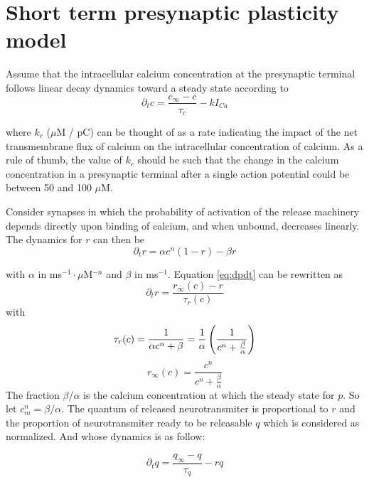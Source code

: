 
\section{Short term presynaptic plasticity model}

Assume that the intracellular calcium concentration at the presynaptic terminal follows linear decay dynamics toward a steady state according to
\begin{equation}
        \partial_t c = \frac{c_{\infty}-c}{\tau_c} - k I_{Ca}
        \label{eq:dcdt}
\end{equation}


where $k_c$ ($\mu$M / pC) can be thought of as a rate indicating the impact of the net transmembrane flux of calcium on the intracellular concentration of calcium. As a rule of thumb, the value of $k_c$ should be such that the change in the calcium concentration in a presynaptic terminal after a single action potential could be between 50 and 100  $\mu$M.

Consider synapses in which the probability of activation of the release machinery  depends directly upon binding of calcium, and when unbound, decreases linearly. The dynamics for $r$ can then be
\begin{equation}
   \partial_t r =  \alpha c^n(1-r)-\beta r   \label{eq:dpdt}
\end{equation}

with $\alpha$ in ms$^{-1} \cdot \mu$M$^{-n}$ and $\beta$ in  ms$^{-1}$.
Equation \eqref{eq:dpdt}
can be rewritten as 
\begin{equation}
   \partial_t r = \frac{r_{\infty}(c)-r}{\tau_r(c)} 
\end{equation}
with 
\begin{equation}
    \tau_r(c) = \frac{1}{\alpha c^n + \beta}= \frac{1}{\alpha} \left(\frac{1}{ c^n + \frac{\beta}{\alpha}}\right) 
\end{equation}
\begin{equation}
r_{\infty}(c) = \frac{c^n}{c^n + \frac{\beta}{\alpha}} 
\label{eq:pInfty}
\end{equation}
The fraction $ \beta/\alpha$ is the calcium concentration at which the steady state for $p$. So let $c_m^n=\beta/\alpha$.
The quantum of released neurotransmiter is proportional to $r$ and the proportion of neurotransmiter ready to be releasable $q$ which is considered as normalized. And whose dynamics is as follow: 

\begin{equation}
\partial_t q =  \frac{q_{\infty}-q}{\tau_q} - r q  \label{eq:dxdt}
\end{equation}

